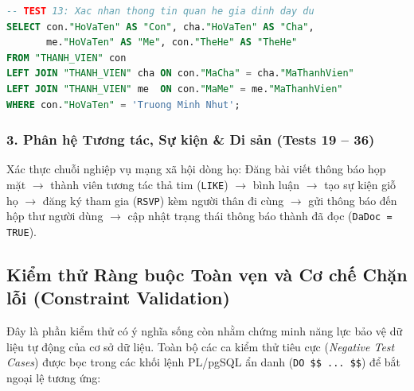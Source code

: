 \begin{lstlisting}[language=SQL, caption={Truy vấn kiểm tra cây phả hệ Cha - Mẹ - Con}, label={lst:test_genealogy}]
-- TEST 13: Xac nhan thong tin quan he gia dinh day du
SELECT con."HoVaTen" AS "Con", cha."HoVaTen" AS "Cha",
       me."HoVaTen" AS "Me", con."TheHe" AS "TheHe"
FROM "THANH_VIEN" con
LEFT JOIN "THANH_VIEN" cha ON con."MaCha" = cha."MaThanhVien"
LEFT JOIN "THANH_VIEN" me  ON con."MaMe" = me."MaThanhVien"
WHERE con."HoVaTen" = 'Truong Minh Nhut';
\end{lstlisting}

\subsubsection{3. Phân hệ Tương tác, Sự kiện \& Di sản (Tests 19 -- 36)}
Xác thực chuỗi nghiệp vụ mạng xã hội dòng họ: Đăng bài viết thông báo họp mặt $\to$ thành viên tương tác thả tim (\texttt{LIKE}) $\to$ bình luận $\to$ tạo sự kiện giỗ họ $\to$ đăng ký tham gia (\texttt{RSVP}) kèm người thân đi cùng $\to$ gửi thông báo đến hộp thư người dùng $\to$ cập nhật trạng thái thông báo thành đã đọc (\texttt{DaDoc = TRUE}).

\subsection{Kiểm thử Ràng buộc Toàn vẹn và Cơ chế Chặn lỗi (Constraint Validation)}

Đây là phần kiểm thử có ý nghĩa sống còn nhằm chứng minh năng lực bảo vệ dữ liệu tự động của cơ sở dữ liệu. Toàn bộ các ca kiểm thử tiêu cực (\textit{Negative Test Cases}) được bọc trong các khối lệnh PL/pgSQL ẩn danh (\texttt{DO \$\$ ... \$\$}) để bắt ngoại lệ tương ứng:

